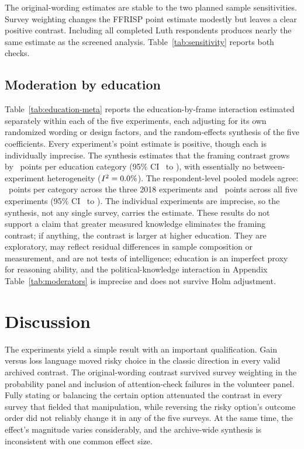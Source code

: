 \documentclass[11pt]{article}
\begin{document}
The original-wording estimates are stable to the two planned sample sensitivities. Survey weighting changes the FFRISP point estimate modestly but leaves a clear positive contrast. Including all completed Luth respondents produces nearly the same estimate as the screened analysis. Table~\ref{tab:sensitivity} reports both checks.

\subsection{Moderation by education}

Table~\ref{tab:education-meta} reports the education-by-frame interaction estimated separately within each of the five experiments, each adjusting for its own randomized wording or design factors, and the random-effects synthesis of the five coefficients. Every experiment's point estimate is positive, though each is individually imprecise. The synthesis estimates that the framing contrast grows by \EducationMetaEffect\ points per education category (95\% CI \EducationMetaLow\ to \EducationMetaHigh), with essentially no between-experiment heterogeneity ($I^2=0.0\%$). The respondent-level pooled models agree: \ModeratorArchiveInteraction\ points per category across the three 2018 experiments and \ModeratorAllInteraction\ points across all five experiments (95\% CI \ModeratorAllLow\ to \ModeratorAllHigh). The individual experiments are imprecise, so the synthesis, not any single survey, carries the estimate. These results do not support a claim that greater measured knowledge eliminates the framing contrast; if anything, the contrast is larger at higher education. They are exploratory, may reflect residual differences in sample composition or measurement, and are not tests of intelligence; education is an imperfect proxy for reasoning ability, and the political-knowledge interaction in Appendix Table~\ref{tab:moderators} is imprecise and does not survive Holm adjustment.



\section{Discussion}

The experiments yield a simple result with an important qualification. Gain versus loss language moved risky choice in the classic direction in every valid archived contrast. The original-wording contrast survived survey weighting in the probability panel and inclusion of attention-check failures in the volunteer panel. Fully stating or balancing the certain option attenuated the contrast in every survey that fielded that manipulation, while reversing the risky option's outcome order did not reliably change it in any of the five surveys. At the same time, the effect's magnitude varies considerably, and the archive-wide synthesis is inconsistent with one common effect size.
\end{document}
